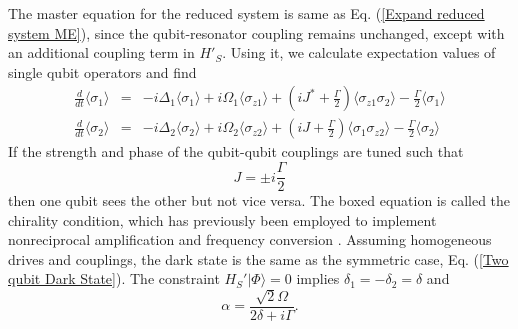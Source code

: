 The master equation for the reduced system is same as Eq. (\ref{Expand reduced system ME}), since the qubit-resonator coupling remains unchanged, except with an additional coupling term in $H'_S$. Using it, we calculate expectation values of single qubit operators and find %
\begin{eqnarray}
\frac{d}{d t} \langle \sigma_1 \rangle & = &  - i \Delta_1 \langle \sigma_1 \rangle + i \Omega_1 \langle \sigma_{z1} \rangle + \left( iJ^* + \frac{\Gamma}{2} \right) \langle \sigma_{z1} \sigma_2 \rangle - \frac{\Gamma}{2} \langle \sigma_1 \rangle  \nonumber \\
\frac{d}{dt } \langle \sigma_2 \rangle &=& - i \Delta_2 \langle \sigma_2 \rangle + i \Omega_2 \langle \sigma_{z2} \rangle + \left( i J + \frac{\Gamma}{2} \right) \langle \sigma_1 \sigma_{z2} \rangle  - \frac{\Gamma}{2} \langle \sigma_2 \rangle \nonumber 
\end{eqnarray}
If the strength and phase of the qubit-qubit couplings are tuned such that
\begin{equation}\label{Chirality_Condition}
\boxed{ J = \pm i \frac{\Gamma}{2} }
\end{equation} 
then one qubit sees the other but not vice versa. The boxed equation is called the chirality condition, which has previously been employed to implement nonreciprocal amplification and frequency conversion \cite{PhysRevLett.113.247003,PhysRevX.5.021025,PhysRevApplied.7.034031}. Assuming 
homogeneous drives and couplings, the dark state is the same as the symmetric case, Eq. (\ref{Two qubit Dark State}). The constraint $H_S' | \Phi \rangle  = 0 $ implies $\delta_1 = - \delta_2 = \delta$ and \cite{Chiral_QO_of_Spin_Chains,Chiral_QO_of_V_Level}
\begin{equation}
    \alpha = \frac{\sqrt{2}\Omega}{2 \delta + i \Gamma}.
\end{equation}
